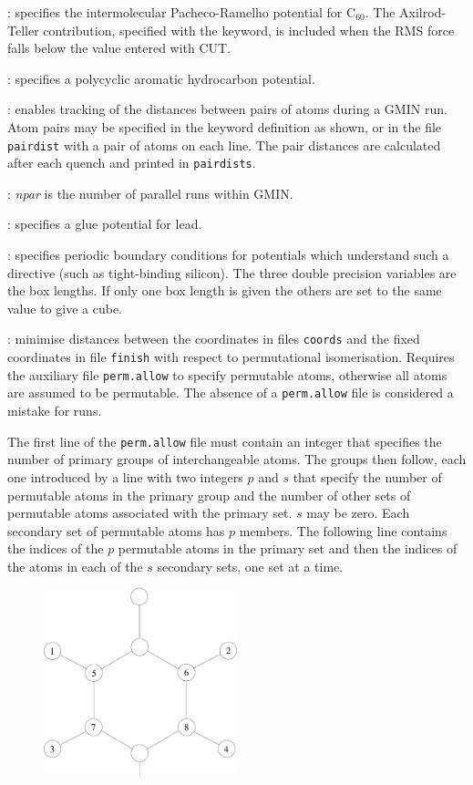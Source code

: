 : specifies the intermolecular Pacheco-Ramelho potential for C$_{60}$.
The Axilrod-Teller contribution, specified with the {\/} keyword, is included
when the RMS force falls below the value entered with {CUT\/}.

: specifies a polycyclic aromatic hydrocarbon potential.

: enables tracking of the distances between pairs of atoms during a GMIN run. Atom pairs may
be specified in the keyword definition as shown, or in the file {\tt pairdist} with a pair of atoms on each line. The pair distances are
calculated after each quench and printed in {\tt pairdists}.

: {\it npar\/} is the number of parallel runs within GMIN.

: specifies a glue potential for lead.

: specifies periodic boundary conditions for
potentials which understand such a directive (such as tight-binding silicon). The three
double precision variables are the box lengths. If only one box length is given the
others are set to the same value to give a cube.

: minimise distances between 
the coordinates in files {\tt coords} and the
fixed coordinates in file {\tt finish} with respect to permutational isomerisation.
Requires the auxiliary file {\tt perm.allow} to specify permutable atoms, otherwise
all atoms are assumed to be permutable. The absence of a {\tt perm.allow}
file is considered a mistake for {\/} runs.

The first line of the {\tt perm.allow} file must contain an integer
that specifies the number of primary groups of interchangeable atoms.
The groups then follow, each one introduced by a line with two integers $p$ and $s$
that specify the number of permutable atoms in the primary group and the number of other sets
of permutable atoms associated with the primary set.
$s$ may be zero.
Each secondary set of permutable atoms has $p$ members.
The following line contains the indices of the $p$ permutable atoms 
in the primary set and then
the indices of the atoms in each of the $s$ secondary sets, one set at 
a time.

\begin{figure}[hH]
\centerline{\includegraphics[width=0.5\textwidth]{PHE.eps}}
\end{figure}

